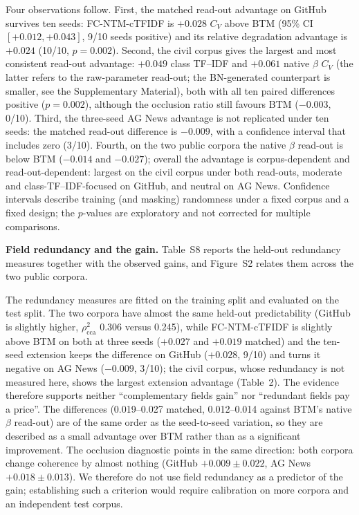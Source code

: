 \documentclass[Journal,letterpaper,NoLists]{ascelike-new}
\begin{document}
Four observations follow. First, the matched read-out advantage on GitHub survives ten seeds:
FC-NTM-cTFIDF is $+0.028$ $C_V$ above BTM (95\% CI $[+0.012,+0.043]$, 9/10 seeds positive) and
its relative degradation advantage is $+0.024$ (10/10, $p=0.002$). Second, the civil corpus gives
the largest and most consistent read-out advantage: $+0.049$ class TF--IDF and $+0.061$ native
$\beta$ $C_V$ (the latter refers to the raw-parameter read-out; the BN-generated counterpart
is smaller, see the Supplementary Material), both with all ten paired differences positive
($p=0.002$), although the occlusion
ratio still favours BTM ($-0.003$, 0/10). Third, the three-seed AG News advantage is not replicated under ten seeds: the matched read-out difference is $-0.009$, with a confidence interval that includes zero (3/10). Fourth, on the
two public corpora the native $\beta$ read-out is below BTM ($-0.014$ and $-0.027$); overall the
advantage is corpus-dependent and read-out-dependent: largest on the civil corpus under both
read-outs, moderate and class-TF--IDF-focused on GitHub, and neutral on AG News. Confidence intervals
describe training (and masking) randomness under a fixed corpus and a fixed design; the $p$-values
are exploratory and not corrected for multiple comparisons.

\noindent\textbf{Field redundancy and the gain.} Table~S8 reports the held-out redundancy measures together with the observed
gains, and Figure~S2 relates them across the two public corpora.

The redundancy measures are fitted on the training split and evaluated on the test split. The two
corpora have almost the same held-out predictability (GitHub is slightly higher,
$\rho^2_{\mathrm{cca}}$ 0.306 versus 0.245), while FC-NTM-cTFIDF is slightly above BTM on both at
three seeds ($+0.027$ and $+0.019$ matched) and the ten-seed extension keeps the difference on
GitHub ($+0.028$, 9/10) and turns it negative on AG News ($-0.009$, 3/10); the civil corpus,
whose redundancy is not measured here, shows the largest extension advantage
(Table~2). The evidence
therefore supports neither ``complementary fields gain'' nor ``redundant fields pay a price''. The
differences (0.019--0.027 matched, 0.012--0.014 against BTM's native $\beta$ read-out) are of the
same order as the seed-to-seed variation, so they are described as a small advantage over BTM
rather than as a significant improvement. The occlusion diagnostic
points in the same direction: both corpora change coherence by almost nothing
(GitHub $+0.009\pm0.022$, AG News $+0.018\pm0.013$). We therefore do not use field redundancy as a
predictor of the gain; establishing such a criterion would require calibration on more corpora and
an independent test corpus.
\end{document}
